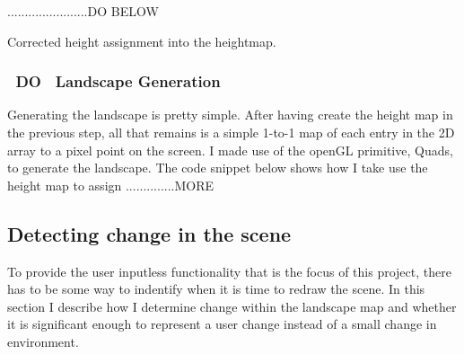 \documentclass[11pt]{article}
\begin{document}
.......................DO BELOW
\begin{algorithm}
\DontPrintSemicolon
{}
\caption{Corrected height assignment into the heightmap.}
\label{algo:assignHeights2}
\end{algorithm}

\subsubsection{~DO~ Landscape Generation}
Generating the landscape is pretty simple. After having create the height map
in the previous step, all that remains is a simple 1-to-1 map of each
entry in the 2D array to a pixel point on the screen. I made use of
the openGL primitive, Quads, to generate the landscape. The code snippet
below shows how I take use the height map to assign ..............MORE
\subsection{Detecting change in the scene}
To provide the user inputless functionality that is the focus of this
project, there has to be some way to indentify when it is time to 
redraw the scene. In this section I describe how I determine change within
the landscape map and whether it is significant enough to represent a 
user change instead of a small change in environment.
\end{document}
